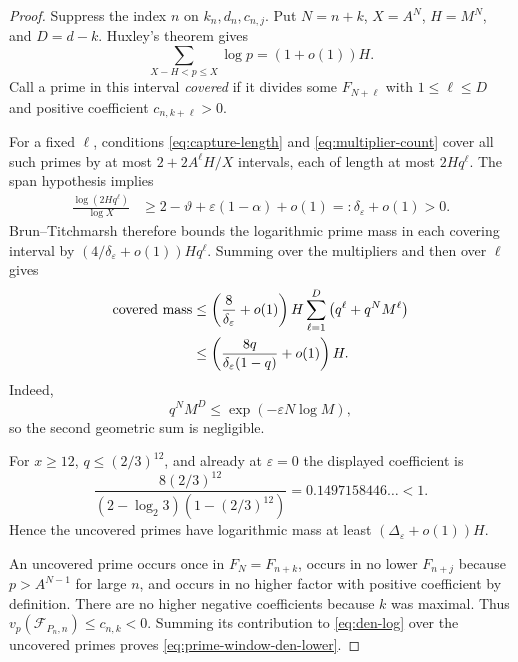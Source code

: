 \documentclass[11pt,oneside]{article}
\theoremstyle{definition}
\theoremstyle{remark}
\newcommand{\thetaAE}{\vartheta}
\newcommand{\cF}{\mathcal F}
\begin{document}
\begin{proof}
Suppress the index $n$ on $k_n,d_n,c_{n,j}$.  Put $N=n+k$, $X=A^N$, $H=M^N$, and
$D=d-k$.  Huxley's theorem gives
\begin{equation}
 \sum_{X-H<p\le X}\log p=(1+o(1))H.
 \label{eq:all-window-mass}
\end{equation}
Call a prime in this interval \emph{covered} if it divides some $F_{N+\ell}$ with
$1\le\ell\le D$ and positive coefficient $c_{n,k+\ell}>0$.

For a fixed $\ell$, conditions \eqref{eq:capture-length} and
\eqref{eq:multiplier-count} cover all such primes by at most
$2+2A^\ell H/X$ intervals, each of length at most $2Hq^\ell$.
The span hypothesis implies
\begin{align}
 \frac{\log(2Hq^\ell)}{\log X}
 &\ge 2-\thetaAE+\varepsilon(1-\alpha)+o(1)
 =:\delta_\varepsilon+o(1)>0.
 \label{eq:capture-exponent}
\end{align}
Brun--Titchmarsh therefore bounds the logarithmic prime mass in each covering interval by
$(4/\delta_\varepsilon+o(1))Hq^\ell$.  Summing over the multipliers and then over $\ell$ gives
\begin{align}
 \text{covered mass}
 &\le
 \left(\frac8{\delta_\varepsilon}+o(1)\right)H
 \sum_{\ell=1}^{D}
 \left(q^\ell+q^NM^\ell\right)\notag\\
 &\le
 \left(\frac{8q}{\delta_\varepsilon(1-q)}+o(1)\right)H.
 \label{eq:covered-mass}
\end{align}
Indeed,
\[
 q^NM^D
 \le\exp(-\varepsilon N\log M),
\]
so the second geometric sum is negligible.

For $x\ge12$, $q\le(2/3)^{12}$, and already at $\varepsilon=0$ the displayed coefficient is
\begin{equation}
 \frac{8(2/3)^{12}}
 {(2-\log_2 3)(1-(2/3)^{12})}
 =0.1497158446\ldots<1.
 \label{eq:numeric-coverage}
\end{equation}
Hence the uncovered primes have logarithmic mass at least
$(\Delta_\varepsilon+o(1))H$.

An uncovered prime occurs once in $F_{N}=F_{n+k}$, occurs in no lower $F_{n+j}$ because
$p>A^{N-1}$ for large $n$, and occurs in no higher factor with positive coefficient by
definition.  There are no higher negative coefficients because $k$ was maximal.  Thus
$v_p(\cF_{P_n,n})\le c_{n,k}<0$.  Summing its contribution to
\eqref{eq:den-log} over the uncovered primes proves
\eqref{eq:prime-window-den-lower}.
\end{proof}
\end{document}
